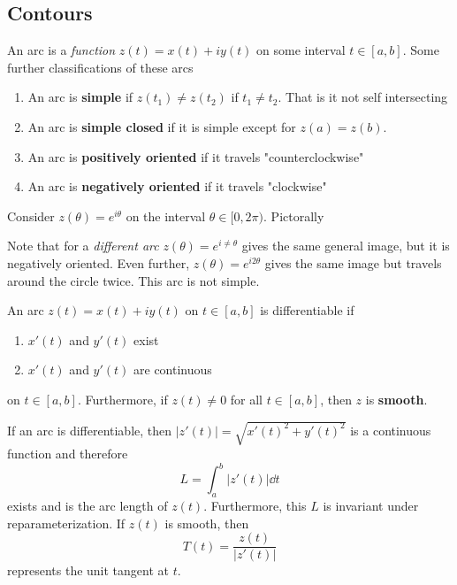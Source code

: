 \documentclass[../notes.tex]{subfiles}
\begin{document}

\subsection{Contours}

\begin{definition}[Arc]
    An arc is a \textit{function} $z(t) = x(t) + i y(t)$ on some interval $t \in [a,b]$. Some further classifications of these arcs
    \begin{enumerate}
        \item An arc is \textbf{simple} if $z(t_1) \neq z(t_2)$ if $t_1 \neq t_2$. That is it not self intersecting
        \item An arc is \textbf{simple closed} if it is simple except for $z(a) = z(b)$.
        \item An arc is \textbf{positively oriented} if it travels "counterclockwise"
        \item An arc is \textbf{negatively oriented} if it travels "clockwise"
    \end{enumerate}
\end{definition}

\begin{example}
    Consider $z(\theta) = e^{i \theta}$ on the interval $\theta \in [0, 2 \pi)$. Pictorally
    \begin{center}
    \end{center}
    Note that for a \textit{different arc} $z(\theta) = e^{i \neq \theta}$ gives the same general image, but it is negatively oriented. Even further, $z(\theta) = e^{i 2 \theta}$ gives the same image but travels around the circle twice. This arc is not simple.
\end{example}

\begin{definition}
    An arc $z(t) = x(t) + i y(t)$ on $t \in [a,b]$ is differentiable if
    \begin{enumerate}
        \item $x'(t)$ and $y'(t)$ exist
        \item $x'(t)$ and $y'(t)$ are continuous
    \end{enumerate}
    on $t \in [a,b]$. Furthermore, if $z(t) \neq 0$ for all $t \in [a,b]$, then $z$ is \textbf{smooth}.

    \begin{remark}
        If an arc is differentiable, then $|z'(t)| = \sqrt{x'(t)^2 + y'(t)^2}$ is a continuous function and therefore
        \[
            L = \int_a^b |z'(t)| \dd t
        \]
        exists and is the arc length of $z(t)$. Furthermore, this $L$ is invariant under reparameterization. If $z(t)$ is smooth, then 
        \[
            T(t) = \frac{z(t)}{|z'(t)|}
        \]
        represents the unit tangent at $t$.
    \end{remark}
\end{definition}
\end{document}
